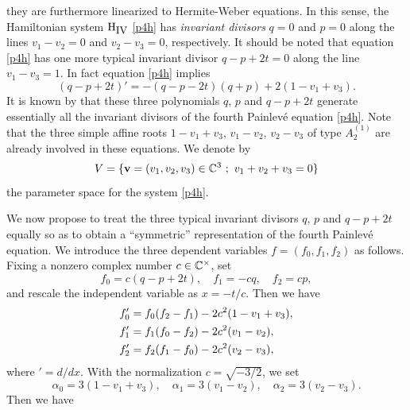 they are furthermore linearized to Hermite-Weber equations. 
In this sense,  the Hamiltonian system 
$\mbox{H}_{\mbox{\small IV}}$
\eqref{p4h} has  {\em invariant divisors} $q=0$ and $p=0$ along the lines 
$v_1-v_2=0$ and $v_2-v_3=0$, respectively. 
It should be noted that equation \eqref{p4h} has one more typical invariant 
divisor $q-p+2t=0$ along the line $v_1-v_3=1$.  
In fact equation \eqref{p4h} implies
\begin{equation}
\label{iv0}
(q-p+2t)'=-(q-p-2t)(q+p) +2(1-v_1+v_3).  
\end{equation}
It is known by \cite{NO} that these three polynomials $q$, $p$ and $q-p+2t$ 
generate essentially all the invariant divisors of the fourth Painlev\'e
equation \eqref{p4h}.  
Note that the three simple affine roots 
$1-v_1+v_3$, $v_1-v_2$, $v_2-v_3$ 
of type $A^{(1)}_2$ are already involved in these equations.  
We denote by 
\begin{equation}
V=\{\mbox{\bf v}=(v_1,v_2,v_3)\in {\Bbb C}^3\ ; \  v_1+v_2+v_3=0 \}
\end{equation}
the parameter space for the system \eqref{p4h}.
\par\medskip
We now propose to treat the three typical invariant divisors 
$q$, $p$ and $q-p+2t$ 
equally so as to obtain a ``symmetric'' representation of the 
fourth Painlev\'e equation. 
We introduce the three dependent variables 
$f=(f_0,f_1,f_2)$ as follows. 
Fixing a nonzero complex number $c\in{\Bbb C}^\times$, set
\begin{equation} 
\label{deffa}
f_0=c(q-p+2t),\quad f_1=-c q, \quad f_2=c p, 
\end{equation} 
and rescale the independent variable as $x=-t/c$. 
Then we have
\begin{equation}\label{p4c}
\begin{align}
&f_0'=f_0(f_2-f_1)-2c^2(1-v_1+v_3),\notag\\
&f_1'=f_1(f_0-f_2)-2c^2(v_1-v_2),\\
&f_2'=f_2(f_1-f_0)-2c^2(v_2-v_3),\notag
\end{align}
\end{equation}
where $'=d/dx$.  
With the normalization $c=\sqrt{-3/2}$, we set
\begin{equation}
\alpha_0=3(1-v_1+v_3),\quad \alpha_1=3(v_1-v_2),\quad \alpha_2=3(v_2-v_3). 
\label{parameter-alpha}
\end{equation}
Then we have 
